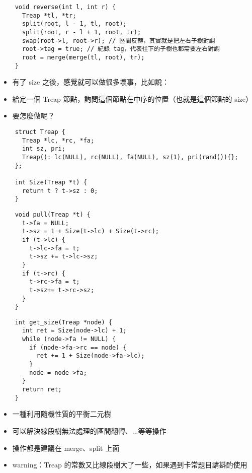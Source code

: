 \documentclass[standalone]{beamer}
\begin{document}
\begin{frame}[fragile]{}
  \begin{verbatim}
    void reverse(int l, int r) {
      Treap *tl, *tr;
      split(root, l - 1, tl, root);
      split(root, r - l + 1, root, tr);
      swap(root->l, root->r); // 區間反轉，其實就是把左右子樹對調
      root->tag = true; // 紀錄 tag，代表往下的子樹也都需要左右對調
      root = merge(merge(tl, root), tr);
    }
  \end{verbatim}
\end{frame}

\begin{frame}[fragile]{}
  \begin{itemize}
    \item 有了 size 之後，感覺就可以做很多壞事，比如說：
    \item 給定一個 Treap 節點，詢問這個節點在中序的位置（也就是這個節點的 size）
    \item 要怎麼做呢？
  \end{itemize}
\end{frame}

\begin{frame}[fragile]{}
  \begin{verbatim}
    struct Treap {
      Treap *lc, *rc, *fa;
      int sz, pri;
      Treap(): lc(NULL), rc(NULL), fa(NULL), sz(1), pri(rand()){};
    };

    int Size(Treap *t) {
      return t ? t->sz : 0;
    }
  \end{verbatim}
\end{frame}

\begin{frame}[fragile]{}
  \begin{verbatim}
    void pull(Treap *t) {
      t->fa = NULL;
      t->sz = 1 + Size(t->lc) + Size(t->rc);
      if (t->lc) {
        t->lc->fa = t;
        t->sz += t->lc->sz;
      }
      if (t->rc) {
        t->rc->fa = t;
        t->sz+= t->rc->sz;
      }
    }
  \end{verbatim}
\end{frame}

\begin{frame}[fragile]{}
  \begin{verbatim}
    int get_size(Treap *node) {
      int ret = Size(node->lc) + 1;
      while (node->fa != NULL) {
        if (node->fa->rc == node) {
          ret += 1 + Size(node->fa->lc);
        }
        node = node->fa;
      }
      return ret;
    }
  \end{verbatim}
\end{frame}

\begin{frame}[fragile]{}
  \begin{itemize}
    \item 一種利用隨機性質的平衡二元樹
    \item 可以解決線段樹無法處理的區間翻轉、...等等操作
    \item 操作都是建議在 merge、split 上面
    \item warning：Treap 的常數又比線段樹大了一些，如果遇到卡常題目請斟酌使用
  \end{itemize}
\end{frame}
\end{document}

